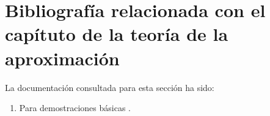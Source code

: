 
\section{Bibliografía relacionada con el capítuto de la teoría de la aproximación} 

La documentación consultada para esta sección ha sido: 

\begin{enumerate}
    \item Para demostraciones básicas \cite{the-elements-of-real-analysis}. 
\end{enumerate}